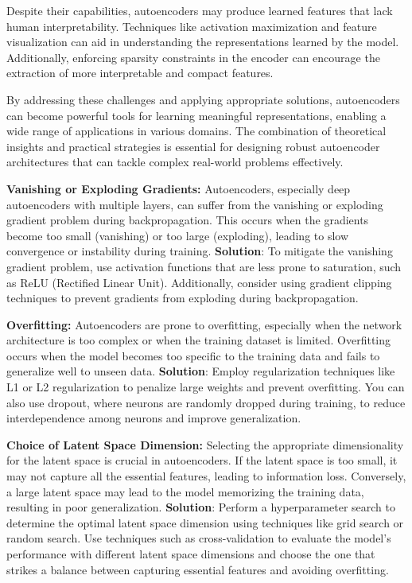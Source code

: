 Despite their capabilities, autoencoders may produce learned features that lack human interpretability. Techniques like activation maximization and feature visualization can aid in understanding the representations learned by the model. Additionally, enforcing sparsity constraints in the encoder can encourage the extraction of more interpretable and compact features.

By addressing these challenges and applying appropriate solutions, autoencoders can become powerful tools for learning meaningful representations, enabling a wide range of applications in various domains. The combination of theoretical insights and practical strategies is essential for designing robust autoencoder architectures that can tackle complex real-world problems effectively.

\begin{list}{}{}
    \item \textbf{Vanishing or Exploding Gradients:}
    Autoencoders, especially deep autoencoders with multiple layers, can suffer from the vanishing or exploding gradient problem during backpropagation. This occurs when the gradients become too small (vanishing) or too large (exploding), leading to slow convergence or instability during training. \textbf{Solution}: To mitigate the vanishing gradient problem, use activation functions that are less prone to saturation, such as ReLU (Rectified Linear Unit). Additionally, consider using gradient clipping techniques to prevent gradients from exploding during backpropagation.
    
    \item \textbf{Overfitting:}
    Autoencoders are prone to overfitting, especially when the network architecture is too complex or when the training dataset is limited. Overfitting occurs when the model becomes too specific to the training data and fails to generalize well to unseen data. \textbf{Solution}: Employ regularization techniques like L1 or L2 regularization to penalize large weights and prevent overfitting. You can also use dropout, where neurons are randomly dropped during training, to reduce interdependence among neurons and improve generalization.
    
    \item \textbf{Choice of Latent Space Dimension:}
    Selecting the appropriate dimensionality for the latent space is crucial in autoencoders. If the latent space is too small, it may not capture all the essential features, leading to information loss. Conversely, a large latent space may lead to the model memorizing the training data, resulting in poor generalization. \textbf{Solution}: Perform a hyperparameter search to determine the optimal latent space dimension using techniques like grid search or random search. Use techniques such as cross-validation to evaluate the model's performance with different latent space dimensions and choose the one that strikes a balance between capturing essential features and avoiding overfitting.
    

\end{list}
